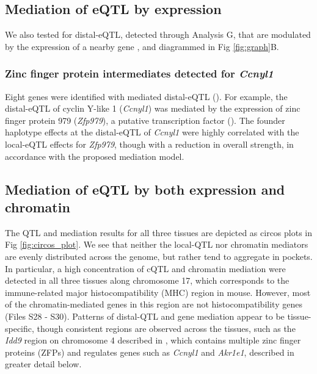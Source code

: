 \documentclass[10pt,letterpaper]{article}
\begin{document}
\subsection*{Mediation of eQTL by expression} 

We also tested for distal-eQTL, detected through Analysis G, that are modulated by the expression of a nearby gene \cite{Keller2018}, and diagrammed in Fig \ref{fig:graph}B. 

\subsubsection*{Zinc finger protein intermediates detected for \textit{Ccnyl1}}
Eight genes were identified with mediated distal-eQTL (). For example, the distal-eQTL of cyclin Y-like 1 (\textit{Ccnyl1}) was mediated by the expression of zinc finger protein 979 (\textit{Zfp979}), a putative transcription factor (). The founder haplotype effects at the distal-eQTL of \textit{Ccnyl1} were highly correlated with the local-eQTL effects for \textit{Zfp979}, though with a reduction in overall strength, in accordance with the proposed mediation model.

\subsection*{Mediation of eQTL by both expression and chromatin}
The QTL and mediation results for all three tissues are depicted as circos plots \cite{Gu2014} in Fig \ref{fig:circos_plot}. We see that neither the local-QTL nor chromatin mediators are evenly distributed across the genome, but rather tend to aggregate in pockets. In particular, a high concentration of cQTL and chromatin mediation were detected in all three tissues along chromosome 17, which corresponds to the immune-related major histocompatibility (MHC) region in mouse. However, most of the chromatin-mediated genes in this region are not histocompatibility genes (Files S28 - S30). Patterns of distal-QTL and gene mediation appear to be tissue-specific, though consistent regions are observed across the tissues, such as the \textit{Idd9} region on chromosome 4 described in \cite{HamiltonWilliams2010}, which contains multiple zinc finger proteins (ZFPs) and regulates genes such as \textit{Ccnyl1} and \textit{Akr1e1}, described in greater detail below.
\end{document}
